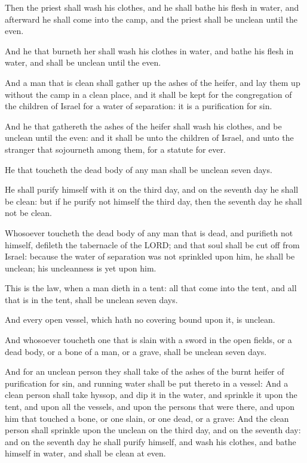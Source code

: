 \Verse Then the priest shall wash his clothes, and he shall bathe his
flesh in water, and afterward he shall come into the camp, and the
priest shall be unclean until the even.

\Verse And he that burneth her shall wash his clothes in water, and
bathe his flesh in water, and shall be unclean until the even.

\Verse And a man that is clean shall gather up the ashes of the heifer,
and lay them up without the camp in a clean place, and it shall be
kept for the congregation of the children of Israel for a water of
separation: it is a purification for sin.

\Verse And he that gathereth the ashes of the heifer shall wash his
clothes, and be unclean until the even: and it shall be unto the
children of Israel, and unto the stranger that sojourneth among them,
for a statute for ever.

\Verse He that toucheth the dead body of any man shall be unclean seven
days.

\Verse He shall purify himself with it on the third day, and on the
seventh day he shall be clean: but if he purify not himself the third
day, then the seventh day he shall not be clean.

\Verse Whosoever toucheth the dead body of any man that is dead, and
purifieth not himself, defileth the tabernacle of the LORD; and that
soul shall be cut off from Israel: because the water of separation was
not sprinkled upon him, he shall be unclean; his uncleanness is yet
upon him.

\Verse This is the law, when a man dieth in a tent: all that come into
the tent, and all that is in the tent, shall be unclean seven days.

\Verse And every open vessel, which hath no covering bound upon it, is
unclean.

\Verse And whosoever toucheth one that is slain with a sword in the
open fields, or a dead body, or a bone of a man, or a grave, shall be
unclean seven days.

\Verse And for an unclean person they shall take of the ashes of the
burnt heifer of purification for sin, and running water shall be put
thereto in a vessel: \Verse And a clean person shall take hyssop, and
dip it in the water, and sprinkle it upon the tent, and upon all the
vessels, and upon the persons that were there, and upon him that
touched a bone, or one slain, or one dead, or a grave: \Verse And the
clean person shall sprinkle upon the unclean on the third day, and on
the seventh day: and on the seventh day he shall purify himself, and
wash his clothes, and bathe himself in water, and shall be clean at
even.


